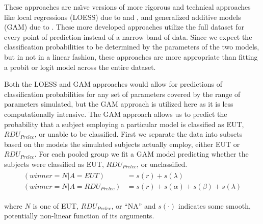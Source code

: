 \documentclass[../main.tex]{subfiles}
\begin{document}
These approaches are na{\"\i}ve versions of more rigorous and technical approaches like local regressions (LOESS) due to \textcite{Cleveland1979} and \textcite{Cleveland1992}, and generalized additive models (GAM) due to \textcite{Hastie1986}.
These more developed approaches utilize the full dataset for every point of prediction instead of a narrow band of data.
Since we expect the classification probabilities to be determined by the parameters of the two models, but in not in a linear fashion, these approaches are more appropriate than fitting a probit or logit model across the entire dataset.

Both the LOESS and GAM approaches would allow for predictions of classification probabilities for any set of parameters covered by the range of parameters simulated, but the GAM approach is utilized here as it is less computationally intensive.
The GAM approach allows us to predict the probability that a subject employing a particular model is classified as EUT, $\mathit{RDU_{Prelec}}$, or unable to be classified.{\footnotemark}
First we separate the data into subsets based on the models the simulated subjects actually employ, either EUT or $\mathit{RDU_{Prelec}}$.
For each pooled group we fit a GAM model predicting whether the subjects were classified as EUT, $\mathit{RDU_{Prelec}}$, or unclassified.
\begin{align}
	\label{eq4:GAM}
	\begin{split}
		(winner = N | A = EUT)                   &= s(r) + s(\lambda)\\
		(winner = N | A = \mathit{RDU_{Prelec}}) &= s(r) + s(\alpha) + s(\beta) + s(\lambda)
	\end{split}
\end{align}

\addtocounter{footnote}{-1}

\noindent where $N$ is one of EUT, $\mathit{RDU_{Prelec}}$, or \enquote{NA} and $s(\cdot)$ indicates some smooth, potentially non-linear function of its arguments.
\end{document}
